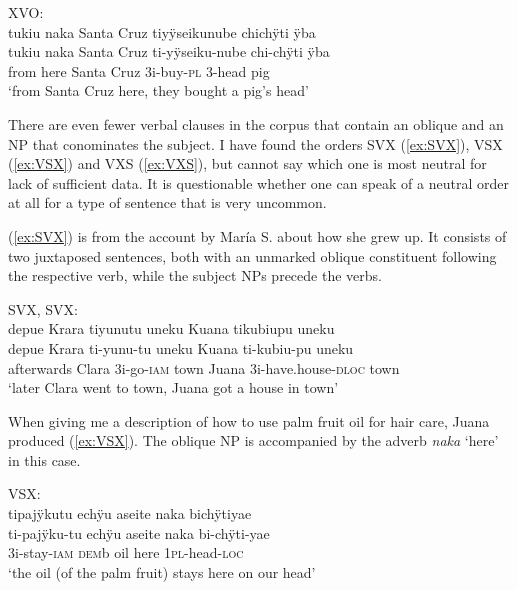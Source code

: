 \ea\label{ex:XVO-2}
\begingl
\glpreamble \textup{XVO:}\\tukiu naka Santa Cruz tiyÿseikunube chichÿti ÿba\\
\gla tukiu naka {Santa Cruz} ti-yÿseiku-nube chi-chÿti ÿba\\
\glb from here {Santa Cruz} 3i-buy-\textsc{pl} 3-head pig\\
\glft ‘from Santa Cruz here, they bought a pig’s head’
\endgl
\trailingcitation{[jxx-e110923l-2.156]}
\xe




There are even fewer verbal clauses in the corpus that contain an oblique and an NP that conominates the subject. I have found the orders SVX (\ref{ex:SVX}), VSX (\ref{ex:VSX}) and VXS (\ref{ex:VXS}), but cannot say which one is most neutral for lack of sufficient data. It is questionable whether one can speak of a neutral order at all for a type of sentence that is very uncommon.

(\ref{ex:SVX}) is from the account by María S. about how she grew up. It consists of two juxtaposed sentences, both with an unmarked oblique constituent following the respective verb, while the subject NPs precede the verbs.


\ea\label{ex:SVX}
\begingl
\glpreamble \textup{SVX, SVX:}\\depue Krara tiyunutu uneku Kuana tikubiupu uneku\\
\gla depue Krara ti-yunu-tu uneku Kuana ti-kubiu-pu uneku\\
\glb afterwards Clara 3i-go-\textsc{iam} town Juana 3i-have.house-\textsc{dloc} town\\
\glft ‘later Clara went to town, Juana got a house in town’
\endgl
\trailingcitation{[rxx-p181101l-2.263]}
\xe



When giving me a description of how to use palm fruit oil for hair care, Juana produced (\ref{ex:VSX}). The oblique NP is accompanied by the adverb \textit{naka} ‘here’ in this case.

\ea\label{ex:VSX}
\begingl
\glpreamble \textup{VSX:}\\tipajÿkutu echÿu aseite naka bichÿtiyae\\
\gla ti-pajÿku-tu echÿu aseite naka bi-chÿti-yae\\
\glb 3i-stay-\textsc{iam} \textsc{dem}b oil here 1\textsc{pl}-head-\textsc{loc}\\
\glft ‘the oil (of the palm fruit) stays here on our head’
\endgl
\trailingcitation{[jxx-d181102l.30]}
\xe


